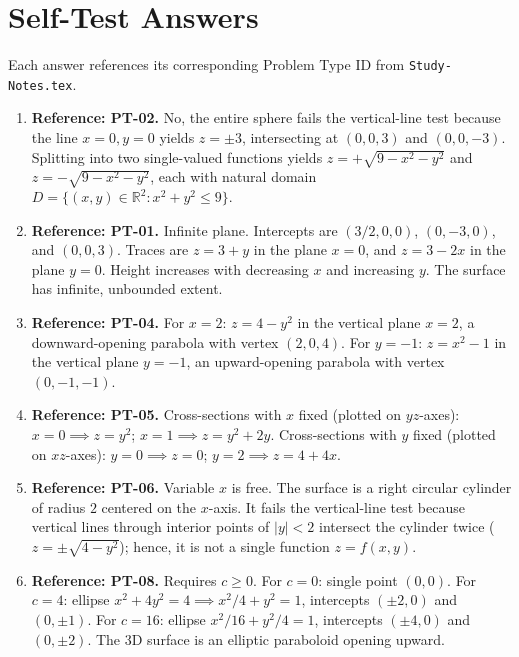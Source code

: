 \documentclass[11pt,letterpaper]{article}
\newcommand{\R}{\mathbb{R}}
\begin{document}
\clearpage

\section{Self-Test Answers}\label{sec:selftest-answers}
Each answer references its corresponding Problem Type ID from \texttt{Study-Notes.tex}.

\begin{enumerate}[label=\textbf{A\arabic*.},leftmargin=*]
    \item \textbf{Reference: PT-02.} No, the entire sphere fails the vertical-line test because the line $x=0, y=0$ yields $z = \pm 3$, intersecting at $(0,0,3)$ and $(0,0,-3)$. Splitting into two single-valued functions yields $z = +\sqrt{9-x^2-y^2}$ and $z = -\sqrt{9-x^2-y^2}$, each with natural domain $D = \{(x,y) \in \R^2 : x^2+y^2 \le 9\}$.
    
    \item \textbf{Reference: PT-01.} Infinite plane. Intercepts are $(3/2, 0, 0)$, $(0, -3, 0)$, and $(0, 0, 3)$. Traces are $z = 3 + y$ in the plane $x=0$, and $z = 3 - 2x$ in the plane $y=0$. Height increases with decreasing $x$ and increasing $y$. The surface has infinite, unbounded extent.
    
    \item \textbf{Reference: PT-04.} For $x = 2$: $z = 4 - y^2$ in the vertical plane $x = 2$, a downward-opening parabola with vertex $(2, 0, 4)$. For $y = -1$: $z = x^2 - 1$ in the vertical plane $y = -1$, an upward-opening parabola with vertex $(0, -1, -1)$.
    
    \item \textbf{Reference: PT-05.} Cross-sections with $x$ fixed (plotted on $yz$-axes): $x=0 \implies z = y^2$; $x=1 \implies z = y^2 + 2y$. Cross-sections with $y$ fixed (plotted on $xz$-axes): $y=0 \implies z = 0$; $y=2 \implies z = 4 + 4x$.
    
    \item \textbf{Reference: PT-06.} Variable $x$ is free. The surface is a right circular cylinder of radius $2$ centered on the $x$-axis. It fails the vertical-line test because vertical lines through interior points of $|y|<2$ intersect the cylinder twice ($z = \pm\sqrt{4-y^2}$); hence, it is not a single function $z=f(x,y)$.
    
    \item \textbf{Reference: PT-08.} Requires $c \ge 0$. For $c=0$: single point $(0,0)$. For $c=4$: ellipse $x^2 + 4y^2 = 4 \implies x^2/4 + y^2 = 1$, intercepts $(\pm 2, 0)$ and $(0, \pm 1)$. For $c=16$: ellipse $x^2/16 + y^2/4 = 1$, intercepts $(\pm 4, 0)$ and $(0, \pm 2)$. The 3D surface is an elliptic paraboloid opening upward.
    

\end{enumerate}
\end{document}
